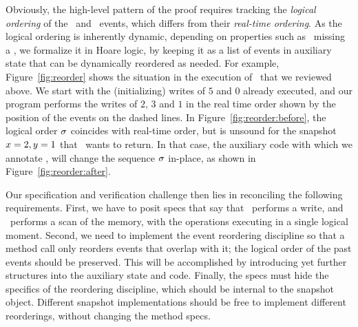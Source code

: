

Obviously, the high-level pattern of the proof requires tracking the
\emph{logical ordering} of the \jywrite\ and \jyscan\ events, which
differs from their \emph{real-time ordering}. As the logical ordering
is inherently dynamic, depending on properties such as
\jyscan\ missing a \jywrite, we formalize it in Hoare logic, by
keeping it as a list of events in auxiliary state that can be
dynamically reordered as needed. For example, Figure~\ref{fig:reorder}
shows the situation in the execution of \jyscan~that we reviewed
above. We start with the (initializing) writes of $5$ and $0$ already
executed, and our program performs the writes of $2$, $3$ and $1$ in
the real time order shown by the position of the events on the dashed
lines. In Figure~\ref{fig:reorder:before}, the logical order
$\sigma$ coincides with real-time order, but is unsound for the
snapshot $x=2, y=1$ that \jyscan~wants to return. In that case, the
auxiliary code with which we annotate \jyscan, will change the
sequence $\sigma$ in-place, as shown in
Figure~\ref{fig:reorder:after}.

Our specification and verification challenge then lies in reconciling
the following requirements. First, we have to posit specs that
say that \jywrite\ performs a write, and \jyscan\ performs a scan of
the memory, with the operations executing in a single logical
moment. Second, we need to implement the event reordering discipline
so that a method call only reorders events that overlap with it; the
logical order of the past events should be preserved. This will be
accomplished by introducing yet further structures into the auxiliary
state and code. Finally, the specs must hide the specifics of
the reordering discipline, which should be internal to the snapshot
object. Different snapshot implementations should be free to implement
different reorderings, without changing the method specs.




